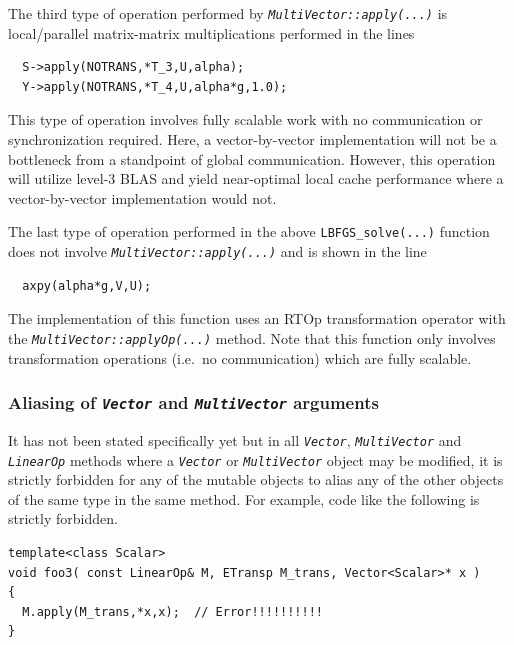 The third type of operation performed by
\texttt{\textit{Multi\-Vector\-::apply(\-...)}} is local/parallel matrix-matrix
multiplications performed in the lines

{\scriptsize\begin{verbatim}
  S->apply(NOTRANS,*T_3,U,alpha);
  Y->apply(NOTRANS,*T_4,U,alpha*g,1.0);
\end{verbatim}}

{}\noindent{}This type of operation involves fully scalable work with no
communication or synchronization required.  Here, a vector-by-vector
implementation will not be a bottleneck from a standpoint of global
communication.  However, this operation will utilize level-3 BLAS and
yield near-optimal local cache performance where a vector-by-vector
implementation would not.

The last type of operation performed in the above
\texttt{LBFGS\_solve(...)}  function does not involve
\texttt{\textit{Multi\-Vector\-::apply(\-...)}} and is shown in the line

{\scriptsize\begin{verbatim}
  axpy(alpha*g,V,U);
\end{verbatim}}

{}\noindent{}The implementation of this function uses an RTOp transformation
operator with the \texttt{\textit{Multi\-Vector\-::applyOp(\-...)}}
method.  Note that this function only involves transformation
operations (i.e.~no communication) which are fully scalable.

%
\subsubsection{Aliasing of \texttt{\textit{Vector}} and \texttt{\textit{Multi\-Vector}} arguments}
\label{tsfcore:sec:aliasing}
%

It has not been stated specifically yet but in all
\texttt{\textit{Vector}}, \texttt{\textit{Multi\-Vector}} and
\texttt{\textit{LinearOp}} methods where a \texttt{\textit{Vector}} or
\texttt{\textit{Multi\-Vector}} object may be modified, it is strictly
forbidden for any of the mutable objects to alias any of the other
objects of the same type in the same method.  For example, code like the
following is strictly forbidden.

{\scriptsize\begin{verbatim}
template<class Scalar>
void foo3( const LinearOp& M, ETransp M_trans, Vector<Scalar>* x )
{
  M.apply(M_trans,*x,x);  // Error!!!!!!!!!!
}
\end{verbatim}}

